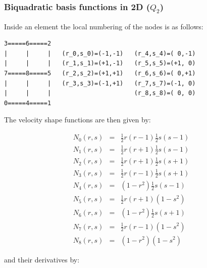 \subsubsection{Biquadratic basis functions in 2D ($Q_2$)}

Inside an element the local numbering of the nodes is as follows:
\begin{verbatim}
3=====6=====2
|     |     |   (r_0,s_0)=(-1,-1)   (r_4,s_4)=( 0,-1)
|     |     |   (r_1,s_1)=(+1,-1)   (r_5,s_5)=(+1, 0)
7=====8=====5   (r_2,s_2)=(+1,+1)   (r_6,s_6)=( 0,+1)
|     |     |   (r_3,s_3)=(-1,+1)   (r_7,s_7)=(-1, 0)
|     |     |                       (r_8,s_8)=( 0, 0)
0=====4=====1
\end{verbatim}

The velocity shape functions are then given by:
\begin{mdframed}[backgroundcolor=blue!5]
\begin{eqnarray}
N_0(r,s)&=& \frac{1}{2}r(r-1)  \frac{1}{2}s(s-1)\nonumber\\
N_1(r,s)&=& \frac{1}{2}r(r+1)  \frac{1}{2}s(s-1)\nonumber\\
N_2(r,s)&=& \frac{1}{2}r(r+1)  \frac{1}{2}s(s+1)\nonumber\\
N_3(r,s)&=& \frac{1}{2}r(r-1)  \frac{1}{2}s(s+1)\nonumber\\
N_4(r,s)&=&     (1-r^2)  \frac{1}{2}s(s-1)\nonumber\\
N_5(r,s)&=& \frac{1}{2}r(r+1)      (1-s^2)\nonumber\\
N_6(r,s)&=&     (1-r^2)  \frac{1}{2}s(s+1)\nonumber\\
N_7(r,s)&=& \frac{1}{2}r(r-1)      (1-s^2)\nonumber\\
N_8(r,s)&=&     (1-r^2)      (1-s^2)\nonumber
\end{eqnarray}
\end{mdframed}
and their derivatives by:
